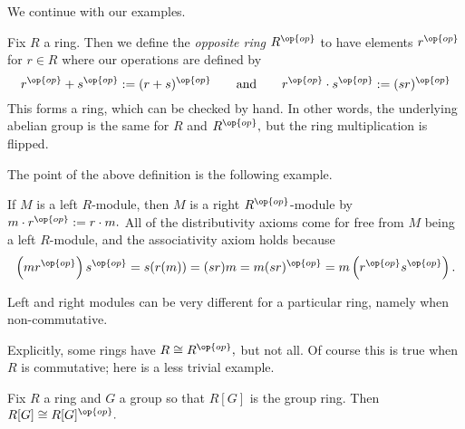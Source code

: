 We continue with our examples.
\begin{definition}
	Fix $R$ a ring. Then we define the \textit{opposite ring} $R^{\op{op}}$ to have elements $r^{\op{op}}$ for $r\in R$ where our operations are defined by
	\[r^{\op{op}}+s^{\op{op}}:=(r+s)^{\op{op}}\qquad\text{and}\qquad r^{\op{op}}\cdot s^{\op{op}}:=(sr)^{\op{op}}\]
	This forms a ring, which can be checked by hand. In other words, the underlying abelian group is the same for $R$ and $R^{\op{op}},$ but the ring multiplication is flipped.
\end{definition}
The point of the above definition is the following example.
\begin{example}
	If $M$ is a left $R$-module, then $M$ is a right $R^{\op{op}}$-module by $m\cdot r^{\op{op}}:=r\cdot m.$ All of the distributivity axioms come for free from $M$ being a left $R$-module, and the associativity axiom holds because
	\[\left(mr^{\op{op}}\right)s^{\op{op}}=s(r(m))=(sr)m=m(sr)^{\op{op}}=m\left(r^{\op{op}}s^{\op{op}}\right).\]
\end{example}
\begin{warn}
	Left and right modules can be very different for a particular ring, namely when non-commutative.
\end{warn}
Explicitly, some rings have $R\cong R^{\op{op}},$ but not all. Of course this is true when $R$ is commutative; here is a less trivial example.
\begin{proposition}
	Fix $R$ a ring and $G$ a group so that $R[G]$ is the group ring. Then $R[G]\cong R[G]^{\op{op}}.$
\end{proposition}
